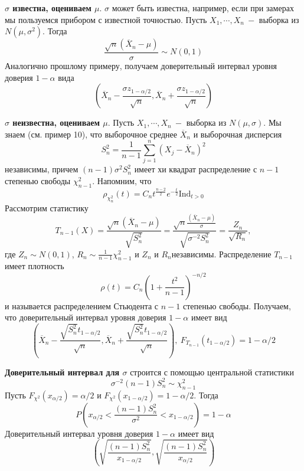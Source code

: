 \par
\textbf{$\sigma $ известна, оцениваем $\mu$}. $\sigma$ может быть известна, например, если при замерах мы пользуемся прибором с известной точностью. Пусть $X_1, \cdots, X_n \ - $ выборка из $N\left(\mu, \sigma ^ 2\right)$. Тогда 
\[
    \frac{\sqrt{n}\left(\overline{X}_n - \mu\right)}{\sigma} \sim N\left(0, 1\right)
\]
Аналогично прошлому примеру, получаем доверительный интервал уровня доверия $1 - \alpha$ вида
\[
    \left(\overline{X}_n - \frac{\sigma z_{1-\alpha/2}}{\sqrt{n}}, \overline{X}_n + \frac{\sigma z_{1-\alpha/2}}{\sqrt{n}}\right)
\]
\par
\textbf{$\sigma$ неизвестна, оцениваем $\mu$}. Пусть $X_1, \cdots, X_n \ -$ выборка из $N\left(\mu, \sigma\right)$. Мы знаем (см. пример 10), что выборочное среднее $\overline{X}_n$ и выборочная дисперсия
\[
    S_n ^ 2 = \frac1{n - 1} \sum_{j=1}^{n} \left(X_j - \overline{X}_n\right) ^ 2
\]
независимы, причем $\left(n - 1\right)\sigma ^ 2 S_n ^ 2$ имеет хи квадрат распределение с $n - 1$ степенью свободы $\chi^2_{n-1}$. Напомним, что
\[
    \rho_{\chi^2_{n}}\left(t\right) = C_n t ^ {\frac{n-2}2} e ^ {-\frac{t}2} \text{Ind}_{t > 0}
\]
Рассмотрим статистику
\[
    T_{n-1}\left(X\right) =\frac{\sqrt{n}\left(\overline{X}_n - \mu\right)}{\sqrt{S_n ^ 2}} = \frac{\sqrt{n}\frac{\left(\overline{X}_n - \mu\right)}{\sigma}}{\sqrt{\sigma ^{-2} S_n ^ 2}} = \frac{Z_n}{\sqrt{R_n}},
\]
где $Z_n \sim N\left(0, 1\right)$, $R_n \sim \frac 1 {n-1} \chi^2_{n-1}$ и $Z_n$ и $R_n$независимы. Распределение $T_{n-1}$ имеет плотность 
\[
    \rho\left(t\right) = C_n \left(1 + \frac{t^2}{n - 1}\right) ^ {-n/2}
\]
и называется распределением Стьюдента с $n - 1$ степенью свободы. Получаем, что доверительный интервал уровня доверия $1 - \alpha$ имеет вид
\[
    \left(\overline{X}_n - \frac{\sqrt{S^2_n} t_{1-\alpha/2}}{\sqrt n}, \overline{X}_n + \frac{\sqrt{S^2_n} t_{1-\alpha/2}}{\sqrt n}\right), \ F_{T_{n-1}}\left(t_{1-\alpha/2}\right) = 1-\alpha/2
\]
\par
\textbf{Доверительный интервал для $\sigma$} строится с помощью центральной статистики
\[
    \sigma ^ {-2}\left(n - 1\right)S_n ^ 2 \sim \chi_{n-1}^2
\]
Пусть $F_{\chi^2}\left(x_{\alpha/2}\right) = \alpha/2$ и $F_{\chi^2}\left(x_{1-\alpha/2}\right) = 1-\alpha/2$. Тогда 
\[
    P\left(x_{\alpha/2} < \frac{\left(n-1\right) S^2_n}{\sigma^2} < x_{1-\alpha/2}\right) = 1 - \alpha
\]
Доверительный интервал уровня доверия $1 - \alpha$ имеет вид
\[
    \left(\sqrt{\frac{\left(n-1\right) S^2_n}{x_{1-\alpha/2}}}, \sqrt{\frac{\left(n-1\right) S^2_n}{x_{\alpha/2}}}\right)
\]
\clearpage

